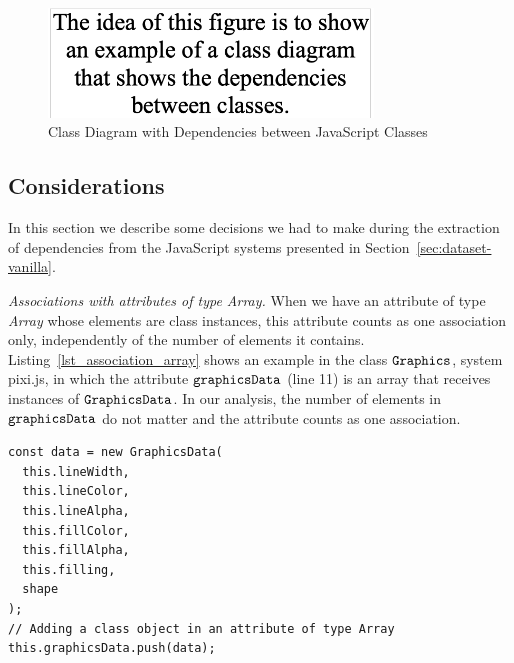 \documentclass[review]{elsarticle}
\newcommand{\mcode}[1]{$\tt #1$}
\begin{document}
\begin{figure}[h]
	\centering
	\captionsetup{justification=centering}
	\includegraphics[width=3.4in]{fig/class-diagram-XXX.png}
	\caption{Class Diagram with Dependencies between JavaScript Classes}
	\label{fig:class-diagram}
\end{figure}



\subsection{Considerations}
\label{sec:considerations-vanilla}

In this section we describe some decisions we had to make during the extraction of dependencies from the JavaScript systems presented in Section~\ref{sec:dataset-vanilla}. 

\vspace{2.0 mm}

\noindent \textit{Associations with attributes of type Array.} When we have an attribute of type \textit{Array} whose elements are class instances, this attribute counts as one association only, independently of the number of elements it contains. Listing~\ref{lst_association_array} shows an example in the class \mcode{Graphics}, system {\sc pixi.js}, in which the attribute \mcode{graphicsData} (line 11) is an array that receives instances of \mcode{GraphicsData}. In our analysis, the number of elements in \mcode{graphicsData} do not matter and the attribute counts as one association.

\begin{lstlisting}[caption=Example of association in class \mcode{Graphics} in system {\sc pixi.js}, label=lst_association_array, emph={[2]graphicsData},emphstyle={[2]\ttfamily\bfseries\color{darkgreen}}]
const data = new GraphicsData(
  this.lineWidth,
  this.lineColor,
  this.lineAlpha,
  this.fillColor,
  this.fillAlpha,
  this.filling,
  shape
);
// Adding a class object in an attribute of type Array
this.graphicsData.push(data);

\end{lstlisting} 
\end{document}
